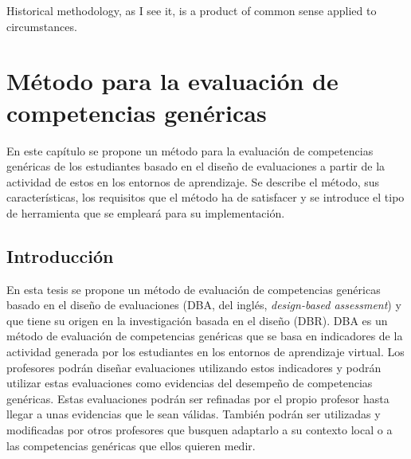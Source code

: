 

\begin{savequote}[50mm]
Historical methodology, as I see it, is a product of common sense applied to circumstances. 
\end{savequote}


\chapter{Método para la evaluación de competencias genéricas}
\label{cha:Overall methodology}

\ifpdf
    \graphicspath{{4_overall_methodology/figures/PNG/}{4_overall_methodology/figures/PDF/}{4_overall_methodology/figures/}}
\else
    \graphicspath{{4_overall_methodology/figures/EPS/}{4_overall_methodology/figures/}}
\fi


En este capítulo se propone un método para la evaluación de competencias genéricas de los estudiantes basado en el diseño de evaluaciones a partir de la actividad de estos en los entornos de aprendizaje. Se describe el método, sus características, los requisitos que el método ha de satisfacer y se introduce el tipo de herramienta que se empleará para su implementación.

\section{Introducción}

En esta tesis se propone un método de evaluación de competencias genéricas basado en el diseño de evaluaciones (DBA, del inglés, \emph{design-based assessment}) y que tiene su origen en la investigación basada en el diseño (DBR). DBA es un método de evaluación de competencias genéricas que se basa en indicadores de la actividad generada por los estudiantes en los entornos de aprendizaje virtual. Los profesores podrán diseñar evaluaciones utilizando estos indicadores y podrán utilizar estas evaluaciones como evidencias del desempeño de competencias genéricas. Estas evaluaciones podrán ser refinadas por el propio profesor hasta llegar a unas evidencias que le sean válidas. También podrán ser utilizadas y modificadas por otros profesores que busquen adaptarlo a su contexto local o a las competencias genéricas que ellos quieren medir. 

